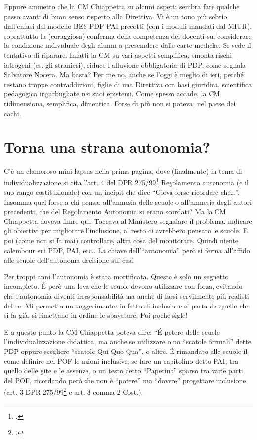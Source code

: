 Eppure ammetto che la CM Chiappetta su alcuni aspetti sembra fare qualche passo avanti di buon senso rispetto alla Direttiva.  Vi è  un tono più sobrio dall'enfasi del modello BES-PDP-PAI precotti (con i moduli mandati dal MIUR), soprattutto la (coraggiosa) conferma della competenza dei docenti sul considerare  la condizione individuale degli alunni a prescindere dalle carte mediche. Si vede il tentativo di riparare. Infatti la CM su vari aspetti semplifica,  smonta  rischi iatrogeni (es. gli stranieri), riduce l'alluvione obbligatoria di PDP, come segnala Salvatore Nocera. Ma basta?  Per me no, anche se l'oggi è meglio di ieri, perché restano troppe contraddizioni, figlie di una Direttiva con basi giuridica, scientifica pedagogica ingarbugliate nei suoi epistemi.  Come spesso accade, la CM ridimensiona, semplifica, dimentica. Forse di più non si poteva, nel paese dei cachi.
\section*{Torna una strana autonomia?}
C'è un clamoroso mini-lapsus nella prima pagina, dove (finalmente) in tema di individualizzazione si cita l'art. 4 del DPR 275/99\footcite{DPR_275_1999} Regolamento autonomia (e il suo rango costituzionale) con un incipit che dice “Giova forse ricordare che…”. Insomma quel forse a chi pensa: all'amnesia delle scuole o all'amnesia degli autori precedenti, che del Regolamento Autonomia si erano scordati?
Ma la CM Chiappetta doveva finire qui. Toccava al Ministero segnalare il problema, indicare gli obiettivi per migliorare l'inclusione, al resto ci avrebbero pensato le scuole. E poi (come non si fa mai) controllare, altra cosa del monitorare. Quindi niente calembour sui PDP, PAI, ecc..
La chiave dell’“autonomia” però si ferma all'affido alle scuole dell'autonoma decisione sui casi.

Per troppi anni l'autonomia è stata mortificata. Questo è solo un segnetto incompleto. \'{E} però una leva che le scuole devono utilizzare con forza, evitando che l'autonomia diventi irresponsabilità ma anche di farsi servilmente più realisti del re. Mi permetto un suggerimento: in fatto di inclusione si parta da quello che si fa già, si rimettano in ordine le sbavature. Poi poche sigle!

E a questo punto la CM Chiappetta poteva dire: “\'{E} potere delle scuole l'individualizzazione  didattica, ma anche se utilizzare o no  “scatole formali” dette PDP oppure scegliere “scatole Qui Quo Qua”, o altre. \'{E} rimandato alle scuole il come definire nel POF le azioni inclusive, se fare un capitolino detto PAI, tra  quello delle gite e le assenze, o un testo detto “Paperino” sparso tra varie parti del POF, ricordando però che non è “potere” ma “dovere” progettare inclusione (art. 3 DPR 275/99\footcite{DPR_275_1999} e art. 3 comma 2 Cost.).  

